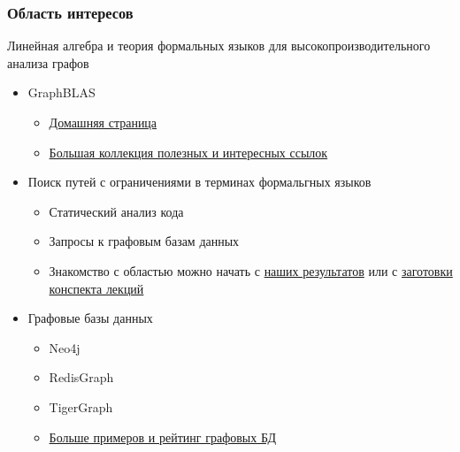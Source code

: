 \documentclass[xcolor=table,aspectratio=169]{beamer}
\begin{document}
\begin{frame}[fragile]

  \frametitle{Область интересов}
  Линейная алгебра и теория формальных языков для высокопроизводительного анализа графов
\begin{itemize}
      \item GraphBLAS
      \begin{itemize}
        \item \href{https://graphblas.github.io/}{Домашняя страница}
        \item \href{https://github.com/GraphBLAS/GraphBLAS-Pointers}{Большая коллекция полезных и интересных ссылок}
      \end{itemize}
      \pause
      \item Поиск путей с ограничениями в терминах формальгных языков
      \begin{itemize}
        \item Статический анализ кода
        \item Запросы к графовым базам данных
        \item Знакомство с областью можно начать с \href{https://research.jetbrains.org/groups/plt_lab/projects/cfpq/}{наших результатов} или с \href{https://github.com/JetBrains-Research/FormalLanguageConstrainedReachability-LectureNotes}{заготовки конспекта лекций}
      \end{itemize}
      \pause
      \item Графовые базы данных
      \begin{itemize}
        \item Neo4j
        \item RedisGraph
        \item TigerGraph
        \item \href{https://db-engines.com/en/ranking/graph+dbms}{Больше примеров и рейтинг графовых БД}        
      \end{itemize}
\end{itemize}

\end{frame}
\end{document}
